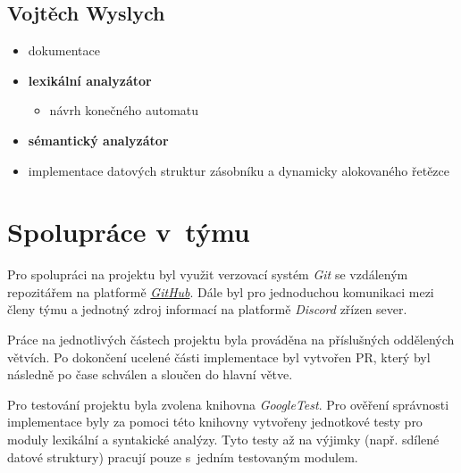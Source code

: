 \documentclass[a4paper, 11pt]{article}
\begin{document}
        \vspace{-1.4em}
        \subsection*{Vojtěch Wyslych}
        \vspace{-0.5em}
            \begin{itemize}
                \setlength{\itemsep}{-2pt}

                \item dokumentace

                \item \textbf{lexikální analyzátor}
                \begin{itemize}
                    \vspace{-6pt}
                    \item[-] návrh konečného automatu
                    \vspace{-4pt}
                \end{itemize}

                \item \textbf{sémantický analyzátor}
                \item implementace datových struktur zásobníku a dynamicky alokovaného řetězce

            \end{itemize}



    \section{Spolupráce v~týmu}

    Pro spolupráci na projektu byl využit verzovací systém \emph{Git} se vzdáleným repozitářem na platformě
    \href{https://github.com/checkster-fit/ifj-1-compiler}{\emph{GitHub}}. Dále byl pro jednoduchou komunikaci
    mezi členy týmu a jednotný zdroj informací na platformě \emph{Discord} zřízen sever.

    Práce na jednotlivých částech projektu byla prováděna na příslušných oddělených větvích.
    Po dokončení ucelené části implementace byl vytvořen PR, který byl následně po čase schválen a
    sloučen do hlavní větve.

    Pro testování projektu byla zvolena knihovna \emph{GoogleTest}. Pro ověření správnosti implementace
    byly za pomoci této knihovny vytvořeny jednotkové testy pro moduly lexikální a syntakické analýzy.
    Tyto testy až na výjimky (např. sdílené datové struktury) pracují pouze s~jedním testovaným modulem.
\end{document}
